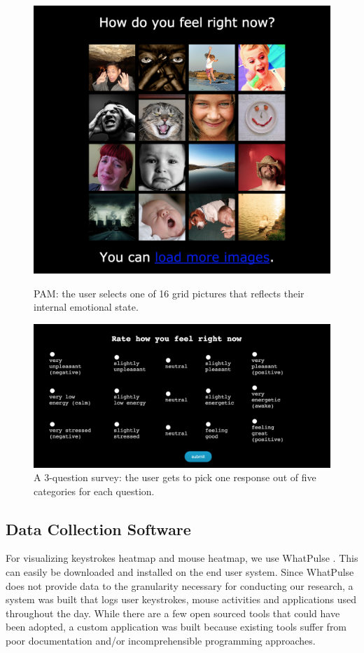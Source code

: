 \documentclass{article}
\begin{document}
\begin{figure}[ht]
		\centering
		\includegraphics[width=\columnwidth]{pam}
		\label{pam}
		\caption{PAM: the user selects one of 16 grid pictures that reflects their internal emotional state.} 
		\label{pam}
\end{figure} 

\begin{figure}[ht]
	\vskip 0.2in
	\begin{center}
		\centerline{\includegraphics[width=\columnwidth]{ema}}
		\caption{A 3-question survey: the user gets to pick one response out of five categories for each question. 
		}
		\label{ema}
	\end{center}
	\vskip -0.2in
\end{figure} 


\subsection{Data Collection Software}
For visualizing keystrokes heatmap and mouse heatmap, we use WhatPulse \cite{whatpulse}. This can easily be downloaded and installed on the end user system. Since WhatPulse does not provide data to the granularity necessary for conducting our research, a system was built that logs user keystrokes, mouse activities and applications used throughout the day. While there are a few open sourced tools that could have been adopted, a custom application was built because existing tools suffer from poor documentation and/or incomprehensible programming approaches. 
\end{document}
